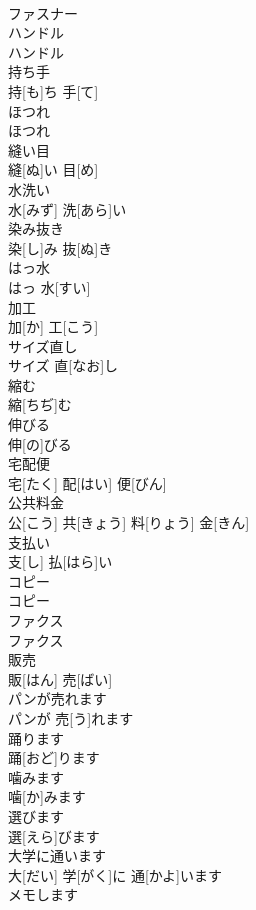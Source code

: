 \documentclass[8pt]{extreport}
\begin{document}
\begin{CJK}{UTF8}{min}
\\	ファスナー		
\\	ハンドル	
\\	ハンドル		
\\	持ち手	
\\	持[も]ち 手[て]		
\\	ほつれ	
\\	ほつれ		
\\	縫い目	
\\	縫[ぬ]い 目[め]		
\\	水洗い	
\\	水[みず] 洗[あら]い		
\\	染み抜き	
\\	染[し]み 抜[ぬ]き		
\\	はっ水	
\\	はっ 水[すい]		
\\	加工	
\\	加[か] 工[こう]		
\\	サイズ直し	
\\	サイズ 直[なお]し		
\\	縮む	
\\	縮[ちぢ]む		
\\	伸びる	
\\	伸[の]びる		
\\	宅配便	
\\	宅[たく] 配[はい] 便[びん]		
\\	公共料金	
\\	公[こう] 共[きょう] 料[りょう] 金[きん]		
\\	支払い	
\\	支[し] 払[はら]い		
\\	コピー	
\\	コピー		
\\	ファクス	
\\	ファクス		
\\	販売	
\\	販[はん] 売[ばい]		
\\	パンが売れます	
\\	パンが 売[う]れます		
\\	踊ります	
\\	踊[おど]ります		
\\	噛みます	
\\	噛[か]みます		
\\	選びます	
\\	選[えら]びます		
\\	大学に通います	
\\	大[だい] 学[がく]に 通[かよ]います		
\\	メモします	

\end{CJK}
\end{document}
